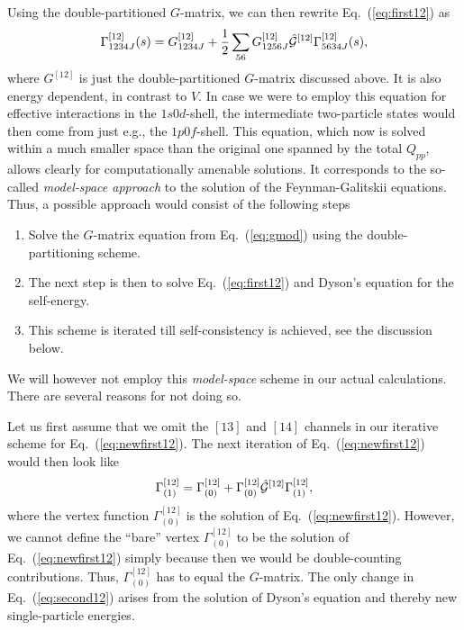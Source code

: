 \documentclass{article}
\begin{document}
Using the double-partitioned $G$-matrix, we can then rewrite
Eq.\ (\ref{eq:first12}) as
\begin{equation}
      \Gamma^{[12]}_{1234J}(s) =
      G^{[12]}_{1234J}+\frac{1}{2}
      \sum_{56}
      G^{[12]}_{1256J}\hat{{\cal G}}^{[12]}
      \Gamma^{[12]}_{5634J}(s),
      \label{eq:newfirst12}
\end{equation}
where $G^{[12]}$ is just the double-partitioned $G$-matrix
discussed above. It is also energy dependent,
in contrast to $V$.
In case we were to employ this equation for effective
interactions in the $1s0d$-shell, the intermediate two-particle
states would then come from just e.g., the $1p0f$-shell.
This equation, which now is solved within a much smaller space
than the original one spanned by the total $Q_{pp}$, allows
clearly for computationally amenable solutions. It corresponds
to the so-called {\em model-space approach} to the solution
of the Feynman-Galitskii equations.
Thus, a possible approach would consist
of the following steps
\begin{enumerate}
\item Solve the $G$-matrix equation from Eq.\ (\ref{eq:gmod})
      using the double-partitioning scheme.
\item The next step is then to solve Eq.\ (\ref{eq:first12})
      and Dyson's equation for the self-energy.
\item This scheme is iterated till self-consistency is achieved,
      see the discussion below.
\end{enumerate}

We will however not employ this {\em model-space} scheme in our
actual calculations. There are several reasons for not doing so.

Let us first assume that we omit the $[13]$ and $[14]$ channels in our
iterative scheme for Eq.\ (\ref{eq:newfirst12}).
The next iteration of Eq.\ (\ref{eq:newfirst12})
would then look like
\begin{equation}
      \Gamma^{[12]}_{(1)} =
      \Gamma_{(0)}^{[12]}+
      \Gamma_{(0)}^{[12]}
       \hat{{\cal G}}^{[12]}\Gamma^{[12]}_{(1)},
      \label{eq:second12}
\end{equation}
where the vertex function $\Gamma_{(0)}^{[12]}$ is the solution
of Eq.\ (\ref{eq:newfirst12}). However, we cannot define
the ``bare'' vertex $\Gamma_{(0)}^{[12]}$ to be the
solution  of Eq.\ (\ref{eq:newfirst12}) simply because then we
would be double-counting contributions.
Thus, $\Gamma_{(0)}^{[12]}$ has to equal the $G$-matrix.
The only change in Eq.\ (\ref{eq:second12})
arises from the solution of Dyson's equation
and thereby new single-particle energies.
\end{document}
